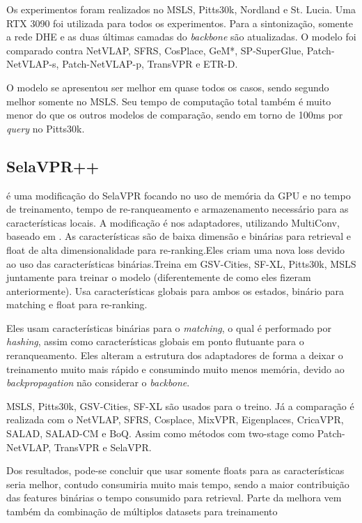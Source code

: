 \documentclass[letterpaper, 10 pt, conference]{ieeeconf}  %
\begin{document}
Os experimentos foram realizados no MSLS, Pitts30k, Nordland e St. Lucia. Uma RTX 3090 foi utilizada para todos os experimentos. Para a sintonização, somente a rede DHE e as duas últimas camadas do \textit{backbone} são atualizadas. O modelo foi comparado contra NetVLAP, SFRS, CosPlace, GeM*, SP-SuperGlue, Patch-NetVLAP-s, Patch-NetVLAP-p, TransVPR e ETR-D.

O modelo se apresentou ser melhor em quase todos os casos, sendo segundo melhor somente no MSLS. Seu tempo de computação total também é muito menor do que os outros modelos de comparação, sendo em torno de 100ms por \textit{query} no Pitts30k.


\subsection{SelaVPR++}
\cite{selavpr++} é uma modificação do SelaVPR focando no uso de memória da GPU e no tempo de treinamento, tempo de re-ranqueamento e armazenamento necessário para as características locais. A modificação é nos adaptadores, utilizando MultiConv, baseado em \cite{crica}. As características são de baixa dimensão e binárias para retrieval e float de alta dimensionalidade para re-ranking.Eles criam uma nova loss devido ao uso das características binárias.Treina em GSV-Cities, SF-XL, Pitts30k, MSLS juntamente para treinar o modelo (diferentemente de como eles fizeram anteriormente). Usa características globais para ambos os estados, binário para matching e float para re-ranking.


Eles usam características binárias para o \textit{matching}, o qual é performado por \textit{hashing}, assim como características globais em ponto flutuante para o reranqueamento. Eles alteram a estrutura dos adaptadores de forma a deixar o treinamento muito mais rápido e consumindo muito menos memória, devido ao \textit{backpropagation} não considerar o \textit{backbone}.

MSLS, Pitts30k, GSV-Cities, SF-XL são usados para o treino. Já a comparação é realizada com o NetVLAP, SFRS, Cosplace, MixVPR, Eigenplaces, CricaVPR, SALAD, SALAD-CM e BoQ. Assim como métodos com two-stage como  Patch-NetVLAP, TransVPR e SelaVPR.

Dos resultados, pode-se concluir que usar somente floats para as características seria melhor, contudo consumiria muito mais tempo, sendo a maior contribuição das features binárias o tempo consumido para retrieval. Parte da melhora vem também da combinação de múltiplos datasets para treinamento
\end{document}
